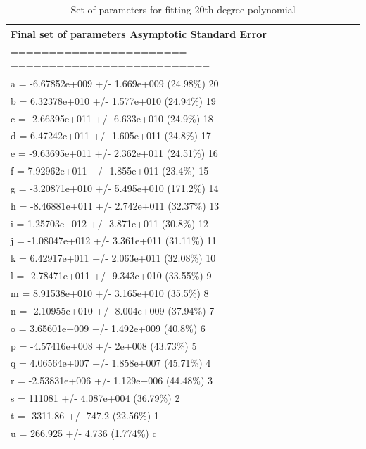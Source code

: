 \documentclass{article}
\begin{document}
\begin{table}
\centering
\caption{Set of parameters for fitting 20th degree polynomial}
\label{nathantable1}
\begin{tabular}{@{}l@{}}
\toprule
Final set of parameters            Asymptotic Standard Error     \\ \midrule
=======================            ==========================    \\
a               = -6.67852e+009    +/- 1.669e+009   (24.98\%) 20 \\
b               = 6.32378e+010     +/- 1.577e+010   (24.94\%) 19 \\
c               = -2.66395e+011    +/- 6.633e+010   (24.9\%) 18  \\
d               = 6.47242e+011     +/- 1.605e+011   (24.8\%) 17  \\
e               = -9.63695e+011    +/- 2.362e+011   (24.51\%) 16 \\
f               = 7.92962e+011     +/- 1.855e+011   (23.4\%) 15  \\
g               = -3.20871e+010    +/- 5.495e+010   (171.2\%) 14 \\
h               = -8.46881e+011    +/- 2.742e+011   (32.37\%) 13 \\
i               = 1.25703e+012     +/- 3.871e+011   (30.8\%) 12  \\
j               = -1.08047e+012    +/- 3.361e+011   (31.11\%) 11 \\
k               = 6.42917e+011     +/- 2.063e+011   (32.08\%) 10 \\
l               = -2.78471e+011    +/- 9.343e+010   (33.55\%) 9  \\
m               = 8.91538e+010     +/- 3.165e+010   (35.5\%) 8   \\
n               = -2.10955e+010    +/- 8.004e+009   (37.94\%) 7  \\
o               = 3.65601e+009     +/- 1.492e+009   (40.8\%) 6   \\
p               = -4.57416e+008    +/- 2e+008       (43.73\%) 5  \\
q               = 4.06564e+007     +/- 1.858e+007   (45.71\%) 4  \\
r               = -2.53831e+006    +/- 1.129e+006   (44.48\%) 3  \\
s               = 111081           +/- 4.087e+004   (36.79\%) 2  \\
t               = -3311.86         +/- 747.2        (22.56\%) 1  \\
u               = 266.925          +/- 4.736        (1.774\%) c  \\ \bottomrule
\end{tabular}
\end{table}
\end{document}
